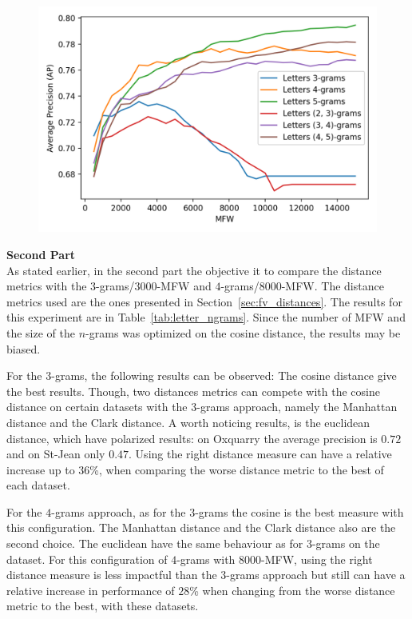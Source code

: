 \begin{figure}
  \label{fig:letter_ngrams_st_jean}
  \includegraphics[width=\linewidth]{img/letter_ngrams_st_jean.png}
\end{figure}

\textbf{Second Part}\\
As stated earlier, in the second part the objective it to compare the distance metrics with the $3$-grams/$3000$-MFW and $4$-grams/$8000$-MFW.
The distance metrics used are the ones presented in Section~\ref{sec:fv_distances}.
The results for this experiment are in Table~\ref{tab:letter_ngrams}.
Since the number of MFW and the size of the $n$-grams was optimized on the cosine distance, the results may be biased.

For the $3$-grams, the following results can be observed:
The cosine distance give the best results.
Though, two distances metrics can compete with the cosine distance on certain datasets with the $3$-grams approach, namely the Manhattan distance and the Clark distance.
A worth noticing results, is the euclidean distance, which have polarized results: on Oxquarry the average precision is $0.72$ and on St-Jean only $0.47$.
Using the right distance measure can have a relative increase up to $36$\%, when comparing the worse distance metric to the best of each dataset.

For the $4$-grams approach, as for the $3$-grams the cosine is the best measure with this configuration.
The Manhattan distance and the Clark distance also are the second choice.
The euclidean have the same behaviour as for $3$-grams on the dataset.
For this configuration of $4$-grams with $8000$-MFW, using the right distance measure is less impactful than the $3$-grams approach but still can have a relative increase in performance of $28$\% when changing from the worse distance metric to the best, with these datasets.

